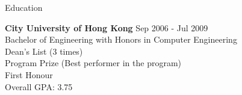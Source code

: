 \documentclass{resume} %
\begin{document}

\begin{rSection}{Education}


{\bf City University of Hong Kong} \hfill {Sep 2006 - Jul 2009} \\ 
Bachelor of Engineering with Honors in Computer Engineering \\
Dean’s List (3 times) \\
Program Prize (Best performer in the program)  \\
First Honour\\
Overall GPA: 3.75

\end{rSection}

\end{document}
